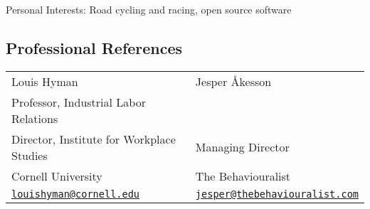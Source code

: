\documentclass[letterpaper,11pt,oneside]{article}
\begin{document}
    Personal Interests: Road cycling and racing, open source software

\newpage
\subsection*{Professional References}
    \begin{tabularx}{\textwidth}{@{} X X}
        Louis Hyman                                             & Jesper Åkesson \\
        Professor, Industrial Labor Relations                    \\
        Director, Institute for Workplace Studies               & Managing Director  \\
        Cornell University                                      & The Behaviouralist \\
        \href{mailto:louishyman@cornell.edu}{\nolinkurl{louishyman@cornell.edu}} &
            \href{mailto:jesper@thebehaviouralist.com}{\nolinkurl{jesper@thebehaviouralist.com}}
    \end{tabularx}
\end{document}
